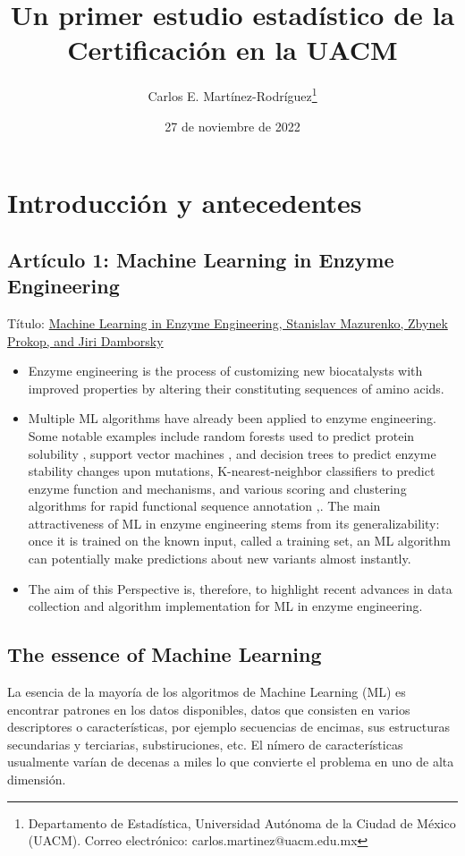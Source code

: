 \documentclass[12pt]{article}
\title{Un primer estudio estad\'istico de la Certificaci\'on en la UACM}
\author{Carlos E. Martínez-Rodríguez\thanks{Departamento de Estadística, Universidad Autónoma de la Ciudad de México (UACM). Correo electrónico: carlos.martinez@uacm.edu.mx}}
\date{27 de noviembre de 2022}
\begin{document}
\maketitle
\tableofcontents

\section{Introducci\'on y antecedentes}


\subsection{Artículo 1: Machine Learning in Enzyme Engineering}
Título: \href{https://pubs.acs.org/doi/full/10.1021/acscatal.9b04321}{Machine Learning in Enzyme Engineering, Stanislav Mazurenko, Zbynek Prokop, and Jiri Damborsky} \cite{Mazurenko}

\begin{itemize}
\item Enzyme engineering is the process of customizing new biocatalysts with improved properties by altering their constituting sequences of amino acids.

\item Multiple ML algorithms have already been applied to enzyme engineering. Some notable examples include random forests used to predict protein solubility \cite{15}, support vector machines \cite{16},\cite{17} and decision trees \cite{18} to predict enzyme stability changes upon mutations, K-nearest-neighbor classifiers to predict enzyme function\cite{19} and mechanisms,\cite{20} and various scoring and clustering algorithms for rapid functional sequence annotation \cite{21},\cite{22}. The main attractiveness of ML in enzyme engineering stems from its generalizability: once it is trained on the known input, called a training set, an ML algorithm can potentially make predictions about new variants almost instantly.

\item The aim of this Perspective is, therefore, to highlight recent advances in data collection and algorithm implementation for ML in enzyme engineering. 

\end{itemize}

\subsection{The essence of Machine Learning}

La esencia de la mayoría de los algoritmos de Machine Learning (ML) es encontrar patrones en los datos disponibles, datos que consisten en varios descriptores o características, por ejemplo secuencias de encimas, sus estructuras secundarias y terciarias, substiruciones, etc.  El nímero de características usualmente varían de decenas a miles lo que convierte el problema en uno de alta dimensión. 
\end{document}
